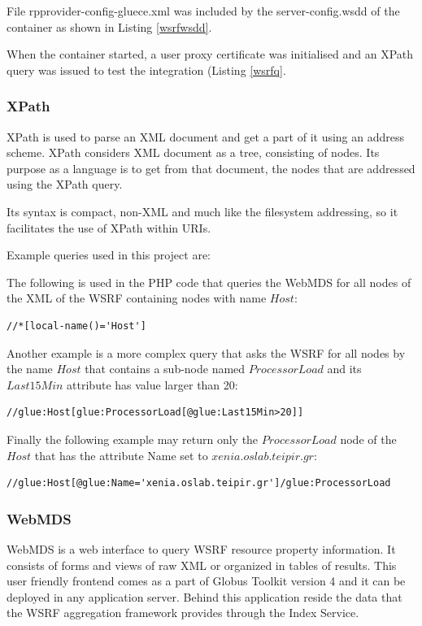 File rpprovider-config-gluece.xml was included by the server-config.wsdd of the container as shown in Listing \ref{wsrfwsdd}.

When the container started, a user proxy certificate was initialised and an XPath query was issued to test the integration (Listing \ref{wsrfq}.
 
\subsubsection{XPath}

XPath is used to parse an XML document and get a part of it using an address scheme. XPath considers XML document as a tree, consisting of nodes. Its purpose as a language is to get from that document, the nodes that are addressed using the XPath query.

Its syntax is compact, non-XML and much like the filesystem addressing, so it facilitates the use of XPath within URIs.

Example queries used in this project are:

The following is used in the PHP code that queries the WebMDS for all nodes of the XML of the WSRF containing nodes with name $Host$:
\begin{lstlisting}
//*[local-name()='Host']
\end{lstlisting}

Another example is a more complex query that asks the WSRF for all nodes by the name $Host$ that contains a sub-node named $ProcessorLoad$ and its $Last15Min$ attribute has value larger than 20:
\begin{lstlisting}
//glue:Host[glue:ProcessorLoad[@glue:Last15Min>20]]
\end{lstlisting}

Finally the following example may return only the $ProcessorLoad$ node of the $Host$ that has the attribute Name set to $xenia.oslab.teipir.gr$:
\begin{lstlisting}
//glue:Host[@glue:Name='xenia.oslab.teipir.gr']/glue:ProcessorLoad
\end{lstlisting}


\subsubsection{WebMDS}

WebMDS is a web interface to query WSRF resource property information. It consists of forms and views of raw XML or organized in tables of results. This user friendly frontend comes as a part of Globus Toolkit version 4 and it can be deployed in any application server. Behind this application reside the data that the WSRF aggregation framework provides through the Index Service.

